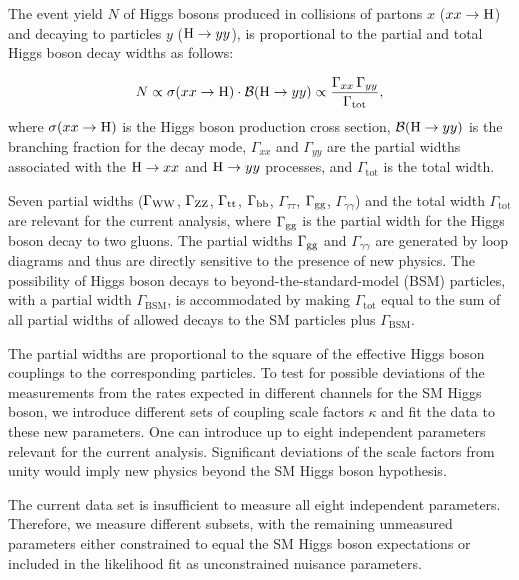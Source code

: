 \documentclass[12pt,twoside,a4paper,cmspaper,final,collab]{cms-tdr}
\begin{document}
The event yield $N$ of Higgs bosons produced in collisions of partons $x$ ($xx \to \mathrm{H}$)
and decaying to particles $y$ ($\mathrm{H} \to yy$), is proportional to the
partial and total Higgs boson decay widths as follows:

\begin{equation}
N \propto \sigma(xx \to \mathrm{H}) \cdot \mathcal{B}(\mathrm{H} \to yy)
  \propto \frac {\Gamma_{xx} \, \Gamma_{yy} }
                { \Gamma_{\mathrm{tot}} },
\end{equation}
where $\sigma(xx \to \mathrm{H})$ is the Higgs boson production cross section, $\mathcal{B}(\mathrm{H} \to yy)$
is the branching fraction for the decay mode, $\Gamma_{xx}$ and
$\Gamma_{yy}$ are the partial widths
associated with the $\mathrm{H} \to xx$ and $\mathrm{H} \to yy$ processes, and $\Gamma_{\mathrm{tot}}$ is the total width.

Seven partial widths
($\Gamma_{\mathrm{W}\mathrm{W}}$,
$\Gamma_{\mathrm{Z}\mathrm{Z}}$,
$\Gamma_{\mathrm{t}\mathrm{t}}$,
$\Gamma_{\mathrm{b}\mathrm{b}}$,
$\Gamma_{\tau\tau}$,
$\Gamma_{\mathrm{g}\mathrm{g}}$,
$\Gamma_{\gamma\gamma}$)
and the total width $\Gamma_{\text{tot}}$ are relevant for the current analysis,
where $\Gamma_{\mathrm{g}\mathrm{g}}$ is the partial width for the Higgs boson decay to two gluons.
The partial widths $\Gamma_{\mathrm{g}\mathrm{g}}$ and $\Gamma_{\gamma\gamma}$ are generated by loop diagrams and thus
are directly sensitive to the presence of new physics.
The possibility of Higgs boson decays to beyond-the-standard-model (BSM) particles,
with a partial width $\Gamma_{\mathrm{BSM}}$, is
accommodated by making $\Gamma_{\text{tot}}$ equal to
the sum of all partial widths of allowed decays to the SM particles plus $\Gamma_{\mathrm{BSM}}$.

The partial widths are proportional to the square of the effective Higgs boson
couplings to the corresponding particles.
To test for possible deviations of the measurements from the rates expected in different channels
for the SM Higgs boson, we introduce different sets of coupling scale factors $\kappa$
and fit the data to these new parameters. One can introduce up to eight independent parameters
relevant for the current analysis.
Significant deviations of the scale factors from unity
would imply new physics beyond the SM Higgs boson hypothesis.

The current data set is insufficient to measure all
eight independent parameters.
Therefore, we measure different subsets, with the remaining
unmeasured parameters either constrained to equal the SM Higgs boson expectations
or included in the likelihood fit as unconstrained nuisance parameters.
\end{document}
